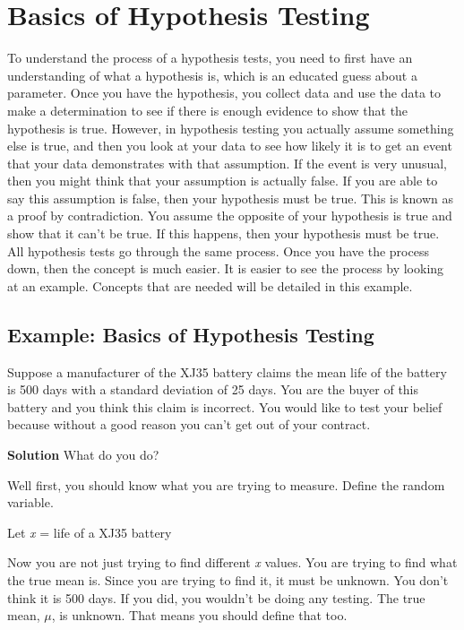 \documentclass[]{book}
\begin{document}
\hypertarget{basics-of-hypothesis-testing}{%
\section{Basics of Hypothesis Testing}\label{basics-of-hypothesis-testing}}

To understand the process of a hypothesis tests, you need to first have an understanding of what a hypothesis is, which is an educated guess about a parameter. Once you have the hypothesis, you collect data and use the data to make a determination to see if there is enough evidence to show that the hypothesis is true. However, in hypothesis testing you actually assume something else is true, and then you look at your data to see how likely it is to get an event that your data demonstrates with that assumption. If the event is very unusual, then you might think that your assumption is actually false. If you are able to say this assumption is false, then your hypothesis must be true. This is known as a proof by contradiction. You assume the opposite of your hypothesis is true and show that it can't be true. If this happens, then your hypothesis must be true. All hypothesis tests go through the same process. Once you have the process down, then the concept is much easier. It is easier to see the process by looking at an example. Concepts that are needed will be detailed in this example.

\hypertarget{example-basics-of-hypothesis-testing}{%
\subsection{Example: Basics of Hypothesis Testing}\label{example-basics-of-hypothesis-testing}}

Suppose a manufacturer of the XJ35 battery claims the mean life of the battery is 500 days with a standard deviation of 25 days. You are the buyer of this battery and you think this claim is incorrect. You would like to test your belief because without a good reason you can't get out of your contract.

\textbf{Solution}
What do you do?

Well first, you should know what you are trying to measure. Define the random variable.

Let \emph{x} = life of a XJ35 battery

Now you are not just trying to find different \emph{x} values. You are trying to find what the true mean is. Since you are trying to find it, it must be unknown. You don't think it is 500 days. If you did, you wouldn't be doing any testing. The true mean, \(\mu\), is unknown. That means you should define that too.
\end{document}
